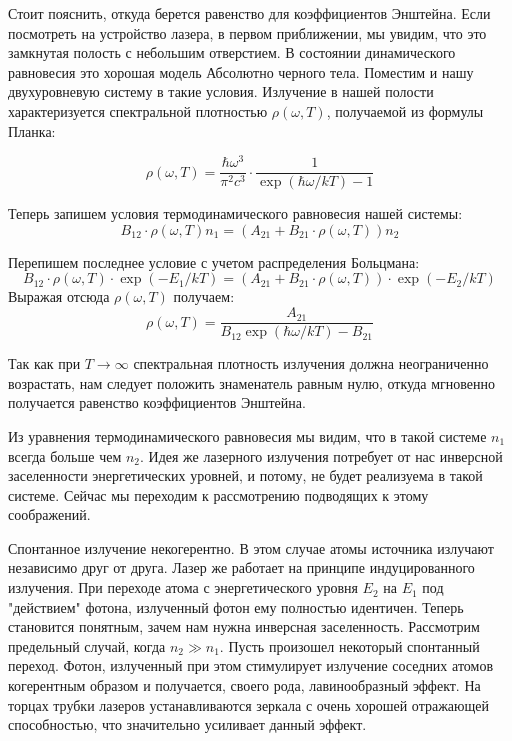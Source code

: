 \documentclass[a4paper,12pt]{article}
\theoremstyle{plain} %
\theoremstyle{definition} %
\theoremstyle{remark} %
\begin{document}
Стоит пояснить, откуда берется равенство для коэффициентов Энштейна.
Если посмотреть на устройство лазера, в первом приближении, мы увидим, что это замкнутая полость с небольшим отверстием. В состоянии динамического равновесия это хорошая модель Абсолютно черного тела. Поместим и нашу двухуровневую систему в такие условия.
Излучение в нашей полости характеризуется спектральной плотностью $\rho(\omega,T)$, получаемой из формулы Планка:

\begin{equation}
\rho(\omega,T) = \frac{\hbar\omega^3}{\pi^2c^3}\cdot\frac{1}{\exp(\hbar\omega/kT)-1}
\end{equation}

Теперь запишем условия термодинамического равновесия нашей системы:
\begin{equation}
B_{12}\cdot\rho(\omega,T)n_1 = (A_{21}+B_{21}\cdot\rho(\omega,T))n_2
\end{equation}
\newpage

Перепишем последнее условие с учетом распределения Больцмана:
\begin{equation}
B_{12}\cdot\rho(\omega,T)\cdot\exp(-E_1/kT) = (A_{21}+B_{21}\cdot\rho(\omega,T))\cdot\exp(-E_2/kT)
\end{equation}
Выражая отсюда $\rho(\omega,T)$ получаем:
\begin{equation}
\rho(\omega,T) = \frac{A_{21}}{B_{12}\exp(\hbar\omega/kT)-B_{21}}
\end{equation}

Так как при $T\longrightarrow \infty$ спектральная плотность излучения должна неограниченно возрастать, нам следует положить знаменатель равным нулю, откуда мгновенно получается равенство коэффициентов Энштейна.

Из уравнения термодинамического равновесия мы видим, что в такой системе $n_1$ всегда больше чем $n_2$. Идея же лазерного излучения потребует от нас инверсной заселенности энергетических уровней, и потому, не будет реализуема в такой системе. Сейчас мы переходим к рассмотрению подводящих к этому соображений.


Спонтанное излучение некогерентно. В этом случае атомы источника излучают независимо друг от друга. Лазер же работает на принципе индуцированного излучения. При переходе атома с энергетического уровня $E_2$ на $E_1$ под "действием" фотона, излученный фотон ему полностью идентичен. Теперь становится понятным, зачем нам нужна инверсная заселенность. Рассмотрим предельный случай, когда $n_2 \gg n_1$. Пусть произошел некоторый спонтанный переход. Фотон, излученный при этом стимулирует излучение соседних атомов когерентным образом и получается, своего рода, лавинообразный эффект.
На торцах трубки лазеров устанавливаются зеркала с очень хорошей отражающей способностью, что значительно усиливает данный эффект.
\end{document}
